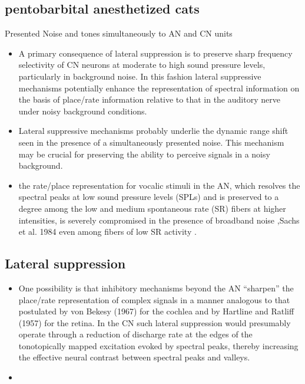 \documentclass[10pt,a4paper]{article}
\begin{document}
\subsection{\citep{RhodeGreenberg:1994a} pentobarbital anesthetized cats}

Presented Noise and tones simultaneously to AN and CN units


\begin{itemize}
\item A primary consequence of lateral suppression is to preserve sharp
  frequency selectivity of CN neurons at moderate to high sound pressure levels,
  particularly in background noise. In this fashion lateral suppressive
  mechanisms potentially enhance the representation of spectral information on
  the basis of place/rate information relative to that in the auditory nerve
  under noisy background conditions.
\item Lateral suppressive mechanisms probably underlie the dynamic range shift
  seen in the presence of a simultaneously presented noise. This mechanism may
  be crucial for preserving the ability to perceive signals in a noisy
  background.
\item the rate/place representation for vocalic stimuli in the AN, which
  resolves the spectral peaks at low sound pressure levels (SPLs) and is
  preserved to a degree among the low and medium spontaneous rate (SR) fibers at
  higher intensities, is severely compromised in the presence of broadband noise
  \citep{GeislerGamble:1989} ,Sachs et al. 1984 even among fibers of low SR
  activity \citep{SachsVoigtEtAl:1983,MillerSachs:1984,SilkesGeisler:1991}.
\end{itemize}

\subsection{Lateral suppression}


\begin{itemize}
\item One possibility is that inhibitory mechanisms beyond the AN
  {\textquotedblleft}sharpen{\textquotedblright} the place/rate representation
  of complex signals in a manner analogous to that postulated by von Bekesy
  (1967) for the cochlea and by Hartline and Ratliff (1957) for the retina. In
  the CN such lateral suppression would presumably operate through a reduction
  of discharge rate at the edges of the tonotopically mapped excitation evoked
  by spectral peaks, thereby increasing the effective neural contrast between
  spectral peaks and valleys.
\item \end{itemize}
\end{document}
